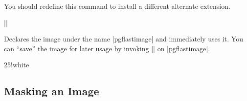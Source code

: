 \begin{command}{\pgfalternateextension}
  You should redefine this command to install a different alternate
  extension.

  \example |\def\pgfalternateextension{!25!white}|
\end{command}


\begin{command}{\pgfimage{}}
  Declares the image under the name |pgflastimage| and
  immediately uses it. You can ``save'' the image for later usage by
  invoking |\pgfaliasimage| on |pgflastimage|.
  
\begin{codeexample}[]
\begin{colormixin}{25!white}
\begin{pgfpicture}

  \pgfpathrectangle{\pgfpoint{1cm}{5cm}}{\pgfpoint{1cm}{1cm}}
  \pgfpathrectangle{\pgfpoint{1cm}{3cm}}{\pgfpoint{1cm}{1cm}}
  \pgfpathrectangle{\pgfpoint{1cm}{1cm}}{\pgfpoint{1cm}{1cm}}
\end{pgfpicture}
\end{colormixin}
\end{codeexample}
\end{command}



\subsection{Masking an Image}



